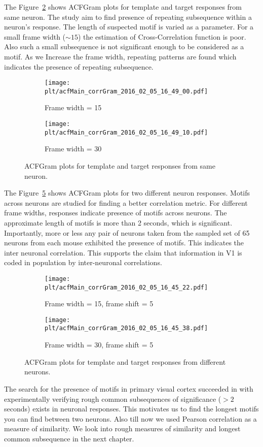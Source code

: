 \documentclass[MTech]{iitmdiss}
\newcommand{\plt}{thesis_plots}
\begin{document}
The Figure~\ref{fig:acfgram_same}  shows ACFGram plots for template and target responses from same neuron. The study aim to find presence of repeating subsequence within a neuron's response. The length of suspected motif is varied as a parameter.
For a small frame width ($\sim 15$) the estimation of Cross-Correlation function is poor. Also such a small subsequence is not significant enough to be considered as a motif. As we Increase the frame width, repeating patterns are found which indicates the presence of repeating subsequence.
\begin{figure}[h]
  \begin{subfigure}[b]{0.5\textwidth}
    \texttt{[image: \\plt/acfMain\_corrGram\_2016\_02\_05\_16\_49\_00.pdf]}
    \caption{Frame width = 15}
    \label{fig:ori_simple}
  \end{subfigure}%
  \begin{subfigure}[b]{0.5\textwidth}
    \texttt{[image: \\plt/acfMain\_corrGram\_2016\_02\_05\_16\_49\_10.pdf]}
    \caption{Frame width = 30}
    \label{fig:acfgram_same}
  \end{subfigure}%
  \caption{ACFGram plots for template and target responses from same neuron.}\label{fig:oridir_simple}
\end{figure}
The Figure~\ref{fig:acfgram_diff} shows ACFGram plots for two different neuron responses. Motifs across neurons are studied for finding a better correlation metric. For different frame widths, responses indicate presence of motifs across neurons. The approximate length of motifs is more than 2 seconds, which is significant. Importantly, more or less any pair of neurons taken from the sampled set of 65 neurons from each mouse exhibited the presence of motifs. This indicates the inter neuronal correlation. This supports the claim that information in V1 is coded in population by inter-neuronal correlations.
\begin{figure}[h]
  \begin{subfigure}[b]{0.5\textwidth}
    \texttt{[image: \\plt/acfMain\_corrGram\_2016\_02\_05\_16\_45\_22.pdf]}
    \caption{Frame width = 15, frame shift = 5}
    \label{fig:ori_simple}
  \end{subfigure}%
  \begin{subfigure}[b]{0.5\textwidth}
    \texttt{[image: \\plt/acfMain\_corrGram\_2016\_02\_05\_16\_45\_38.pdf]}
    \caption{Frame width = 30, frame shift = 5}
    \label{fig:acfgram_diff}
  \end{subfigure}%
  \caption{ACFGram plots for template and target responses from different neurons.}\label{fig:oridir_simple}
\end{figure}
The search for the presence of motifs in primary visual cortex succeeded in with experimentally verifying rough common subsequences of significance ($>2$ seconds) exists in neuronal responses. This motivates us to find the longest motifs you can find between two neurons. Also till now we used Pearson correlation as a measure of similarity. We look into rough measures of similarity and longest common subsequence in the next chapter.
\end{document}
